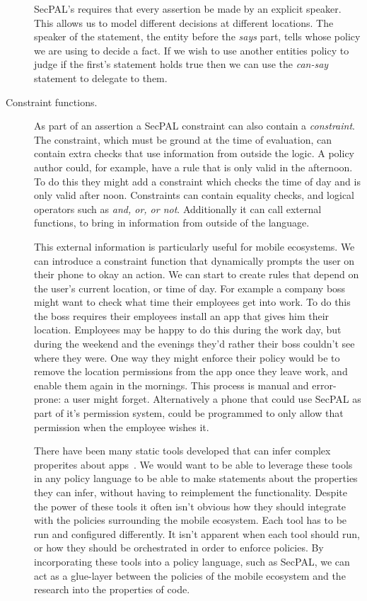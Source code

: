 \documentclass[thesis.tex]{subfiles}
\begin{document}
\begin{description}
    SecPAL's requires that every assertion be made by an explicit speaker.
    This allows us to model different decisions at different locations.
    The speaker of the statement, the entity before the \emph{says} part, tells whose policy we are using to decide a fact.
    If we wish to use another entities policy to judge if the first's statement holds true then we can use the \emph{can-say} statement to delegate to them.

  \item[Constraint functions.]
    As part of an assertion a SecPAL constraint can also contain a \emph{constraint}.
    The constraint, which must be ground at the time of evaluation, can contain extra checks that use information from outside the logic.
    A policy author could, for example, have a rule that is only valid in the afternoon.
    To do this they might add a constraint which checks the time of day and is only valid after noon.
    Constraints can contain equality checks, and logical operators such as \emph{and, or, \emph{or} not}.
    Additionally it can call external functions, to bring in information from outside of the language.

    This external information is particularly useful for mobile ecosystems.
    We can introduce a constraint function that dynamically prompts the user on their phone to okay an action.
    We can start to create rules that depend on the user's current location, or time of day.
    For example a company boss might want to check what time their employees get into work.
    To do this the boss requires their employees install an app that gives him their location.
    Employees may be happy to do this during the work day, but during the weekend and the evenings they'd rather their boss couldn't see where they were.
    One way they might enforce their policy would be to remove the location permissions from the app once they leave work, and enable them again in the mornings.
    This process is manual and error-prone: a user might forget.
    Alternatively a phone that could use SecPAL as part of it's permission system, could be programmed to only allow that permission when the employee wishes it.

    There have been many static tools developed that can infer complex properites about apps~\cite{felt_android_2011,song_integrated_2016,antonin_carette_investigating_2017,schmidt_static_2009,enck_taintdroid:_2014}.
    We would want to be able to leverage these tools in any policy language to be able to make statements about the properties they can infer, without having to reimplement the functionality.
    Despite the power of these tools it often isn't obvious how they should integrate with the policies surrounding the mobile ecosystem.
    Each tool has to be run and configured differently.
    It isn't apparent when each tool should run, or how they should be orchestrated in order to enforce policies.
    By incorporating these tools into a policy language, such as SecPAL, we can act as a glue-layer between the policies of the mobile ecosystem and the research into the properties of code.
\end{description}
\end{document}
